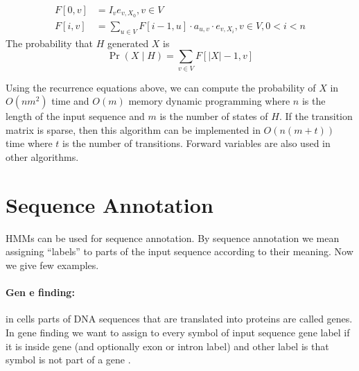 \begin{align}
F[0,v] &= I_ve_{v,X_0}, v\in V\\
F[i,v] &= \sum_{u\in V}F[i-1,u] \cdot a_{u,v} \cdot e_{v,X_i}, v\in V,0< i < n
\end{align}
The probability that $H$ generated $X$ is 
 \[\Pr\left(X\mid H\right) = \sum_{v\in V} F[|X|-1,v]\]

Using the recurrence equations above, we can compute the probability of $X$ in
$O(nm^2)$ time and $O(m)$ memory dynamic programming where $n$ is the length
of the input sequence and $m$ is the number of states of $H$. If the transition
matrix is sparse, then this algorithm can be implemented in $O(n(m+t))$ time
where $t$ is the number of transitions.  Forward variables are also used in other
algorithms. 

\section{Sequence Annotation}


HMMs can be used for sequence annotation. By sequence annotation we mean
assigning ``labels'' to parts of the input sequence according to their meaning.
Now we give few examples.

\paragraph{Gen e finding:} in cells parts of DNA sequences that are translated
into proteins are called genes.  In gene finding we want to assign to every
symbol of input sequence gene label if it is inside gene (and optionally exon
or intron label) and other label is that symbol is not part of a gene
\cite{GeneWise2004,Brejova2005,Burge1997,Alexanderson2004}.


